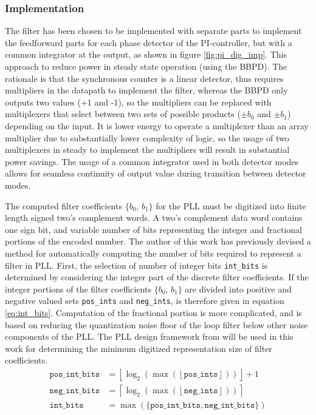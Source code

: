 		\subsubsection{Implementation}
			The filter has been chosen to be implemented with separate parts to implement the feedforward parts for each phase detector of the PI-controller, but with a common integrator at the output, as shown in figure \ref{fig:pi_dig_imp}. This approach to reduce power in steady state operation (using the BBPD). The rationale is that the synchronous counter is a linear detector, thus requires multipliers in the datapath to implement the filter, whereas the BBPD only outputs two values (+1 and -1), so the multipliers can be replaced with multiplexers that select between two sets of possible products ($\pm b_0$ and $\pm b_1$) depending on the input. It is lower energy to operate a multiplexer than an array multiplier due to substantially lower complexity of logic, so the usage of two multiplexers in steady to implement the multipliers will result in substantial power savings. The usage of a common integrator used in both detector modes allows for seamless continuity of output value during transition between detector modes. 

			The computed filter coefficients $\{b_0$, $b_1\}$ for the PLL must be digitized into finite length signed two's complement words. A two's complement data word contains one sign bit, and variable number of bits representing the integer and fractional portions of the encoded number. The author of this work has previously devised a method \cite{Me} for automatically computing the number of bits required to represent a filter in PLL. First, the selection of number of integer bits \texttt{int\_bits} is determined by considering the integer part of the discrete filter coefficients. If the integer portions of the filter coefficients $\{b_0$, $b_1\}$ are divided into positive and negative valued sets \texttt{pos\_ints} and \texttt{neg\_ints}, is therefore given in equation \ref{eq:int_bits}. Computation of the fractional portion is more complicated, and is based on reducing the quantization noise floor of the loop filter below other noise components of the PLL. The PLL design framework from \cite{Me} will be used in this work for determining the minimum digitized representation size of filter coefficients.
			\begin{align}
				\mathtt{pos\_int\_bits} &= \left\lfloor \log_2\left(\max\left(\left\lfloor \mathtt{pos\_ints} \right\rfloor\right)\right) \right\rfloor +1\\
				\mathtt{neg\_int\_bits} &= \left\lceil \log_2\left(\max\left(\left\lfloor \mathtt{neg\_ints} \right\rfloor\right)\right) \right\rceil\\
				\mathtt{int\_bits} &= \max(\mathtt{\{pos\_int\_bits}, \mathtt{neg\_int\_bits}\})\label{eq:int_bits}
			\end{align}


